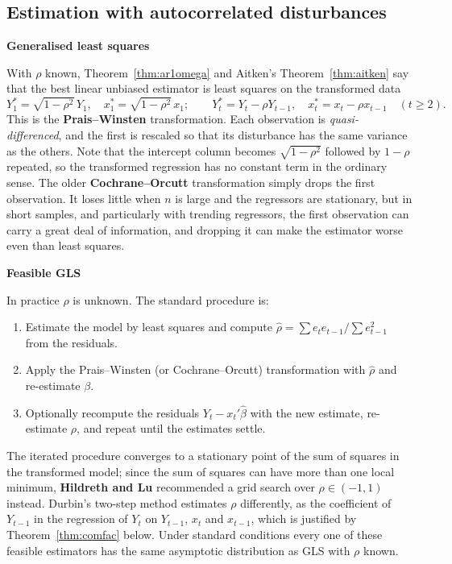 \documentclass[11pt,a4paper]{article}
\numberwithin{equation}{section}
\theoremstyle{definition}
\newcommand{\subhead}[1]{%
  \par\medskip\noindent\textbf{#1}\par\nobreak\smallskip}
\begin{document}
\subsection{Estimation with autocorrelated disturbances}
\label{ssec:acest}

\subhead{Generalised least squares}
With $\rho$ known, Theorem~\ref{thm:ar1omega} and Aitken's Theorem~\ref{thm:aitken} say that the best linear unbiased estimator is least squares on the
transformed data
\begin{equation}
\label{eq:praiswinsten}
Y_1^* = \sqrt{1 - \rho^2}\,Y_1,\quad x_1^* = \sqrt{1 - \rho^2}\,x_1; \qquad Y_t^* = Y_t - \rho Y_{t-1},\quad x_t^* = x_t - \rho x_{t-1} \quad (t \geq 2) .
\end{equation}
This is the \textbf{Prais--Winsten} transformation. Each observation is \emph{quasi-differenced}, and the first is rescaled so that its disturbance has the
same variance as the others. Note that the intercept column becomes $\sqrt{1 - \rho^2}$ followed by $1 - \rho$ repeated, so the transformed regression
has no constant term in the ordinary sense. The older \textbf{Cochrane--Orcutt} transformation simply drops the first observation. It loses little when
$n$ is large and the regressors are stationary, but in short samples, and particularly with trending regressors, the first observation can carry
a great deal of information, and dropping it can make the estimator worse even than least squares.

\subhead{Feasible GLS}
In practice $\rho$ is unknown. The standard procedure is:
\begin{enumerate}
\item Estimate the model by least squares and compute $\hat\rho = \sum e_te_{t-1}/\sum e_{t-1}^2$ from the residuals.
\item Apply the Prais--Winsten (or Cochrane--Orcutt) transformation with $\hat\rho$ and re-estimate $\beta$.
\item Optionally recompute the residuals $Y_t - x_t'\hat\beta$ with the new estimate, re-estimate $\rho$, and repeat until the estimates settle.
\end{enumerate}
The iterated procedure converges to a stationary point of the sum of squares in the transformed model; since the sum of squares can have more than one
local minimum, \textbf{Hildreth and Lu} recommended a grid search over $\rho \in (-1, 1)$ instead. Durbin's two-step method estimates $\rho$ differently, as the
coefficient of $Y_{t-1}$ in the regression of $Y_t$ on $Y_{t-1}$, $x_t$ and $x_{t-1}$, which is justified by Theorem~\ref{thm:comfac} below. Under standard conditions every
one of these feasible estimators has the same asymptotic distribution as GLS with $\rho$ known.
\end{document}
